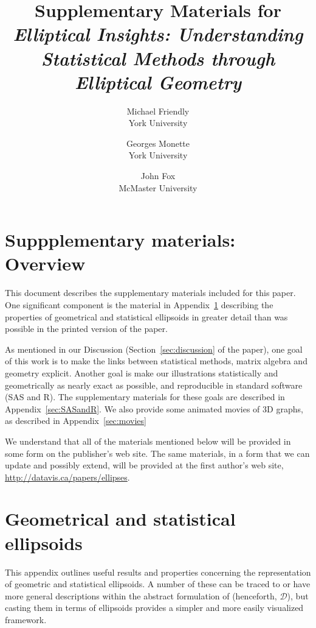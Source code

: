 \documentclass[11pt]{article}%
\newcommand*{\secref}[1]{Section~\ref{#1}}
\newcommand*{\appref}[1]{Appendix~\ref{#1}}
\begin{document}
\begin{titlepage}
\title{Supplementary Materials for \emph{Elliptical Insights: Understanding Statistical Methods through Elliptical Geometry}}
\author{Michael Friendly%
 \\ York University
\and
Georges Monette \\ York University
\and
John Fox \\ McMaster University
}
\end{titlepage}
\maketitle

\section*{Suppplementary materials: Overview}

This document describes the supplementary materials included for this paper.  One significant component
is the material in  \appref{sec:Appendix}  describing the properties of geometrical and statistical
ellipsoids in greater detail than was possible in the printed version of the paper.

As mentioned in our Discussion
(\secref{sec:discussion} of the paper), one goal of this work is to make the links between statistical methods, matrix algebra
and geometry explicit. Another goal is make our illustrations statistically and geometrically 
as nearly exact as possible, and reproducible in standard software (SAS and R).  The supplementary materials
for these goals are described in \appref{sec:SASandR}.  We also provide some animated movies of 3D
graphs, as described in \appref{sec:movies}

We understand that all of the materials mentioned below will be provided in some form on the publisher's
web site.  The same materials, in a form that we can update and possibly extend, will be provided
at the first author's web site, \url{http://datavis.ca/papers/ellipses}. 

\appendix
{}
\section{Geometrical and statistical ellipsoids}\label{sec:Appendix}
This appendix outlines useful results and properties concerning the representation of geometric and statistical ellipsoids.
A number of these can be traced to or have more general descriptions within the abstract formulation of \citet{Dempster:69}
(henceforth, $\mathcal{D}$),
but casting them in terms of ellipsoids provides a simpler and more easily visualized framework. 




\end{document}
